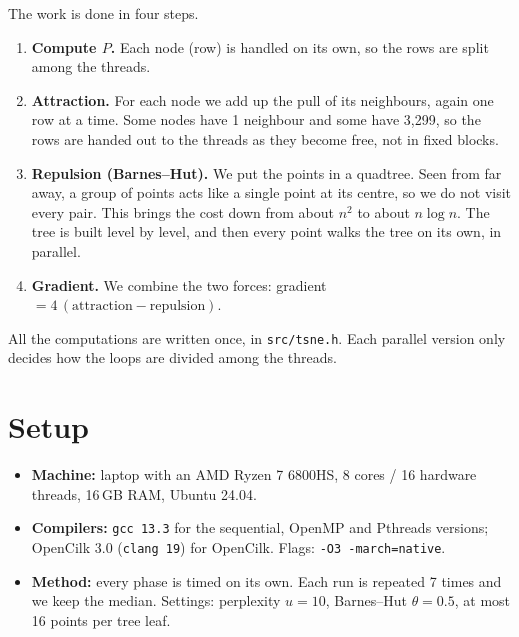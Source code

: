 \documentclass[11pt,a4paper]{article}
\newcommand{\code}[1]{\texttt{#1}}
\begin{document}
The work is done in four steps.

\begin{enumerate}
  \item \textbf{Compute $P$.} Each node (row) is handled on its own, so
    the rows are split among the threads.

  \item \textbf{Attraction.} For each node we add up the pull of its
    neighbours, again one row at a time. Some nodes have 1 neighbour and
    some have 3{,}299, so the rows are handed out to the threads as they
    become free, not in fixed blocks.

  \item \textbf{Repulsion (Barnes--Hut).} We put the points in a
    quadtree. Seen from far away, a group of points acts like a single
    point at its centre, so we do not visit every pair. This brings the
    cost down from about $n^2$ to about $n \log n$.
    The tree is built level by level, and then every point walks the
    tree on its own, in parallel.

  \item \textbf{Gradient.} We combine the two forces:
    gradient $= 4\,(\text{attraction} - \text{repulsion})$.
\end{enumerate}

All the computations are written once, in \code{src/tsne.h}. Each
parallel version only decides how the loops are divided among the
threads.

\section{Setup}

\begin{itemize}
  \item \textbf{Machine:} laptop with an AMD Ryzen 7 6800HS, 8 cores /
    16 hardware threads, 16\,GB RAM, Ubuntu 24.04.
  \item \textbf{Compilers:} \code{gcc 13.3} for the sequential, OpenMP
    and Pthreads versions; OpenCilk 3.0 (\code{clang 19}) for OpenCilk.
    Flags: \code{-O3 -march=native}.
  \item \textbf{Method:} every phase is timed on its own. Each run is
    repeated 7 times and we keep the median. Settings: perplexity
    $u=10$, Barnes--Hut $\theta=0.5$, at most 16 points per tree leaf.
\end{itemize}

\end{document}
